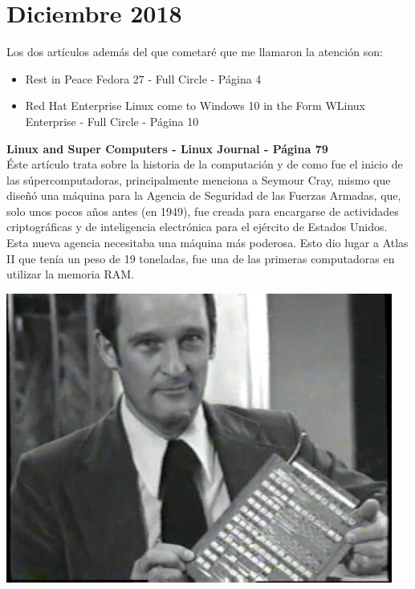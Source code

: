 \documentclass[a4paper, 11pt, oneside]{article}
\begin{document}
\section*{Diciembre 2018}
Los dos artículos además del que cometaré que me llamaron la atención son:
\begin{itemize}
    \item Rest in Peace Fedora 27 - Full Circle - Página 4
    \item Red Hat Enterprise Linux come to Windows 10 in the Form WLinux Enterprise - Full Circle - Página 10
\end{itemize}
\textbf{Linux and Super Computers - Linux Journal - Página 79}\\
Éste artículo trata sobre la historia de la computación y de como fue el inicio de las súpercomputadoras, principalmente menciona a Seymour Cray, mismo que diseñó una máquina para la Agencia de Seguridad de las Fuerzas Armadas, que, solo unos pocos años antes (en 1949), fue creada para encargarse de actividades criptográficas y de inteligencia electrónica para el ejército de Estados Unidos. Esta nueva agencia necesitaba una máquina más poderosa. Esto dio lugar a Atlas II que tenía un peso de 19 toneladas, fue una de las primeras computadoras en utilizar la memoria RAM.

    \begin{center}
        \includegraphics[scale=0.50]{seymour.jpg}
    \end{center}
    
\end{document}
